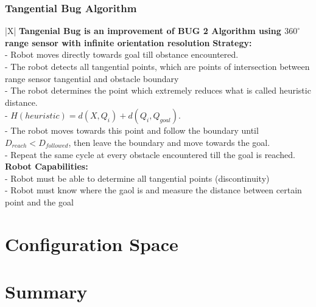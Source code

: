 \documentclass[handout]{beamer}
\begin{document}
\begin{frame}
  \frametitle{Tangential Bug Algorithm}
  \centering
  \begin{scriptsize}
  \begin{table}
    \begin{tblr}{|X|}
      \hline
      \textbf{Tangenial Bug is an improvement of BUG 2 Algorithm using $360^{\circ}$ range sensor with infinite orientation resolution}
        \textbf{Strategy: } \\
        
           -  Robot moves directly towards goal till obstance encountered.\\
           -  The robot detects all tangential points, which are points of intersection between range sensor tangential and obstacle boundary\\
           -  The robot determines the point which extremely reduces what is called heuristic distance.\\        
           -  $H(heuristic) = d(X, Q_{i}) + d(Q_{i}, Q_{goal})$.\\
           -  The robot moves towards this point and follow the boundary until $D_{reach} < D_{followed}$, then leave the boundary and move towards the goal. \\
           -  Repeat the same cycle at every obstacle encountered till the goal is reached.\\
        \hline 
        \textbf{Robot Capabilities: } \\
         - Robot must be able to determine all tangential points (discontinuity)\\
         - Robot must know where the gaol is and measure the distance between certain point and the goal \\
        \hline
    \end{tblr}
  \end{table}
\end{scriptsize}
\end{frame}

\section[Configuration Space]{Configuration Space}

\section*{Summary}
\end{document}
